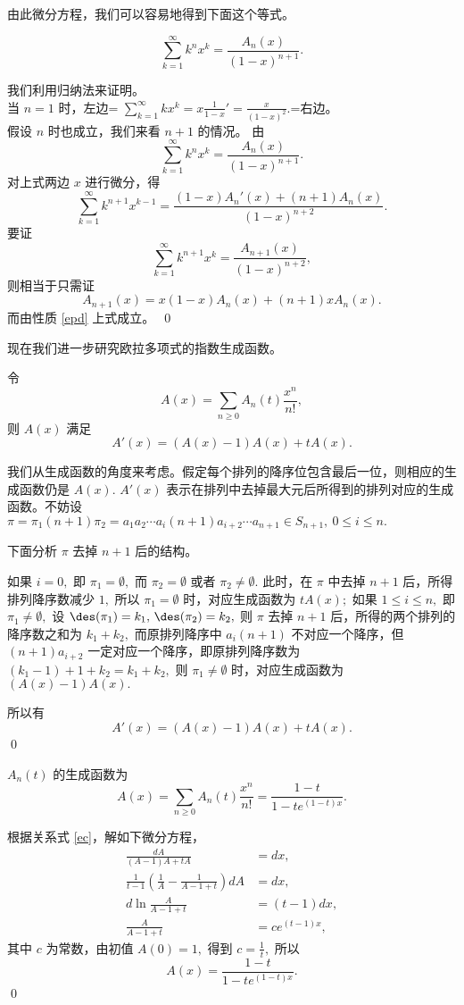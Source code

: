 由此微分方程，我们可以容易地得到下面这个等式。

\begin{prop}\label{pELdxs}
\begin{equation}
\sum\limits^{\infty}_{k=1}k^nx^k=\frac{A_n(x)}{(1-x)^{n+1}}.
\end{equation}
\end{prop}
\pf 我们利用归纳法来证明。\\
当 $n=1$ 时，左边=
$\sum\limits^{\infty}_{k=1}kx^k=x\frac{1}{1-x}'=\frac{x}{(1-x)^2}.$=右边。\\
假设 $n$ 时也成立，我们来看 $n+1$ 的情况。 由
\[  \sum\limits^{\infty}_{k=1}k^nx^k=\frac{A_n(x)}{(1-x)^{n+1}}.   \]
对上式两边 $x$ 进行微分，得
\[
\sum\limits^{\infty}_{k=1}k^{n+1}x^{k-1}=\frac{(1-x)A_n'(x)+(n+1)A_n(x)}{(1-x)^{n+2}}.\]
要证　\[
\sum\limits^{\infty}_{k=1}k^{n+1}x^k=\frac{A_{n+1}(x)}{(1-x)^{n+2}},\]
则相当于只需证
\[A_{n+1}(x)=x(1-x)A_n(x)+(n+1)xA_n(x).\]
而由性质 \eqref{epd} 上式成立。　\qed




现在我们进一步研究欧拉多项式的指数生成函数。

\begin{thm} \label{ec}
令 $$A(x)=\sum_{n\geq0}A_n(t)\frac{x^n}{n!},$$ 则 $A(x)$ 满足
\begin{equation}
A'(x)=(A(x)-1)A(x)+tA(x).
\end{equation}
\end{thm}
\pf
我们从生成函数的角度来考虑。假定每个排列的降序位包含最后一位，则相应的生成函数仍是
$A(x).$ $A'(x)$
表示在排列中去掉最大元后所得到的排列对应的生成函数。不妨设
$\pi=\pi_1(n+1)\pi_2=a_1a_2\cdots a_i(n+1)a_{i+2}\cdots a_{n+1}\in
S_{n+1},\ 0\leq i\leq n.$

下面分析 $\pi$ 去掉 $n+1$ 后的结构。

如果 $i=0,$ 即 $\pi_1=\emptyset,$ 而 $\pi_2=\emptyset$ 或者
$\pi_2\neq \emptyset.$ 此时，在 $\pi$ 中去掉 $n+1$
后，所得排列降序数减少 $1,$ 所以 $\pi_1=\emptyset$
时，对应生成函数为 $tA(x);$ 如果 $1\leq i\leq n,$ 即 $\pi_1\neq
\emptyset,$ 设 $\des(\pi_1)=k_1,\,\des(\pi_2)=k_2,$ 则 $\pi$ 去掉
$n+1$ 后，所得的两个排列的降序数之和为 $k_1+k_2,$ 而原排列降序中
$a_i(n+1)$ 不对应一个降序，但 $(n+1)a_{i+2}$
一定对应一个降序，即原排列降序数为
$\left(k_1-1\right)+1+k_2=k_1+k_2,$ 则 $\pi_1\neq \emptyset$
时，对应生成函数为 $(A(x)-1)A(x).$

所以有 $$A'(x)=(A(x)-1)A(x)+tA(x).$$ \qed

\begin{coro}
$A_n(t)$ 的生成函数为
$$A(x)=\sum_{n\geq
0}A_n(t)\frac{x^n}{n!}=\frac{1-t}{1-te^{(1-t)x}}.$$
\end{coro}
\pf 根据关系式 \eqref{ec}，解如下微分方程， \allowdisplaybreaks
\begin{align*}\frac{d A}{(A-1)A+tA}&=d x,\\[5pt]
\frac{1}{t-1}\left(\frac{1}{A}-\frac{1}{A-1+t}\right)d A&=dx,\\[5pt]
 d\ln\frac{A}{A-1+t}&=(t-1)dx,\\[5pt]
\frac{A}{A-1+t}&=ce^{(t-1)x},
\end{align*}其中 $c$ 为常数，由初值 $A(0)=1,$ 得到 $c=\frac{1}{t},$
所以 $$A(x)=\frac{1-t}{1-te^{(1-t)x}}.$$ \qed

